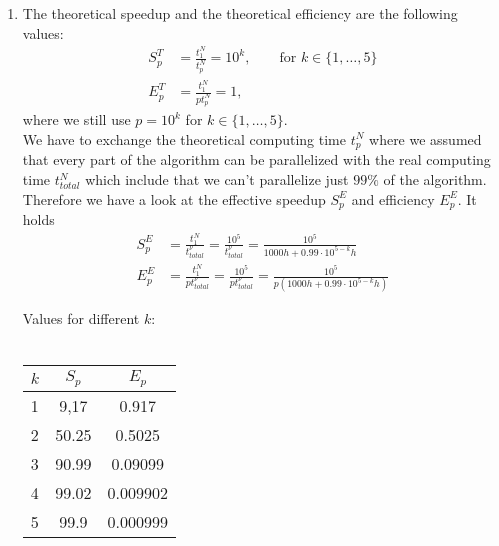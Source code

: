 \documentclass{article}
\begin{document}
\begin{enumerate}[label=(\alph*)]
\item The theoretical speedup and the theoretical efficiency are the following values:
\begin{align*}
    S_p^T &= \frac{t_1^N}{t_p^N} = 10^k,\qquad \text{for }k\in\{1,\dots,5\}\\
    E_p^T &= \frac{t_1^N}{pt_p^N} = 1,
\end{align*}
where we still use $p=10^k$ for $k\in\{1,\dots,5\}.$\\
We have to exchange the theoretical computing time $t_p^N$ where we assumed that every part of the algorithm can be parallelized with the real computing time $t_{total}^N$ which include that we can't parallelize just $99\%$ of the algorithm.
Therefore we have a look at the effective speedup $S_p^E$ and efficiency $E_p^E$. It holds
\begin{align*}
     S_p^E &= \frac{t_1^N}{t_{total}^\nu}= \frac{10^5}{t_{total}^\nu} = \frac{10^5}{1000h + 0.99 \cdot 10^{5-k}h}\\
     E_p^E &= \frac{t_1^N}{pt_{total}^\nu} = \frac{10^5}{pt_{total}^\nu} = \frac{10^5}{p(1000h + 0.99 \cdot 10^{5-k}h)}
\end{align*}
    \begin{center}
    Values for different $k$:\\~\\
\begin{tabular}{ l | c | c } 
  $k$ & $S_p$ & $E_p$\\
  \hline
  1 &  9,17 & 0.917 \\
  2 &  50.25 & 0.5025 \\
  3 &  90.99 & 0.09099 \\
  4 &  99.02 & 0.009902 \\
  5 &  99.9 & 0.000999 \\
\end{tabular}        
    \end{center}
    

\end{enumerate}
\end{document}
